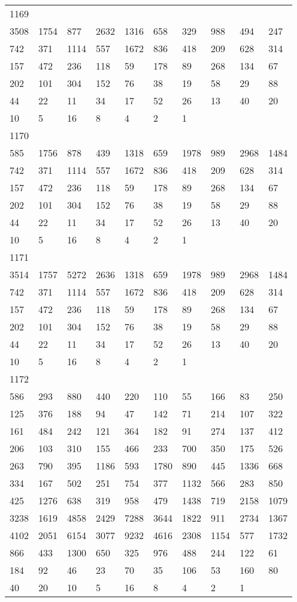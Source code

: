 \begin{longtable}{*{10}{l}}
1169&&&&&&&&&\\
3508& 1754& 877& 2632& 1316& 658& 329& 988& 494& 247\\
742& 371& 1114& 557& 1672& 836& 418& 209& 628& 314\\
157& 472& 236& 118& 59& 178& 89& 268& 134& 67\\
202& 101& 304& 152& 76& 38& 19& 58& 29& 88\\
44& 22& 11& 34& 17& 52& 26& 13& 40& 20\\
10& 5& 16& 8& 4& 2& 1& \\

1170&&&&&&&&&\\
585& 1756& 878& 439& 1318& 659& 1978& 989& 2968& 1484\\
742& 371& 1114& 557& 1672& 836& 418& 209& 628& 314\\
157& 472& 236& 118& 59& 178& 89& 268& 134& 67\\
202& 101& 304& 152& 76& 38& 19& 58& 29& 88\\
44& 22& 11& 34& 17& 52& 26& 13& 40& 20\\
10& 5& 16& 8& 4& 2& 1& \\

1171&&&&&&&&&\\
3514& 1757& 5272& 2636& 1318& 659& 1978& 989& 2968& 1484\\
742& 371& 1114& 557& 1672& 836& 418& 209& 628& 314\\
157& 472& 236& 118& 59& 178& 89& 268& 134& 67\\
202& 101& 304& 152& 76& 38& 19& 58& 29& 88\\
44& 22& 11& 34& 17& 52& 26& 13& 40& 20\\
10& 5& 16& 8& 4& 2& 1& \\

1172&&&&&&&&&\\
586& 293& 880& 440& 220& 110& 55& 166& 83& 250\\
125& 376& 188& 94& 47& 142& 71& 214& 107& 322\\
161& 484& 242& 121& 364& 182& 91& 274& 137& 412\\
206& 103& 310& 155& 466& 233& 700& 350& 175& 526\\
263& 790& 395& 1186& 593& 1780& 890& 445& 1336& 668\\
334& 167& 502& 251& 754& 377& 1132& 566& 283& 850\\
425& 1276& 638& 319& 958& 479& 1438& 719& 2158& 1079\\
3238& 1619& 4858& 2429& 7288& 3644& 1822& 911& 2734& 1367\\
4102& 2051& 6154& 3077& 9232& 4616& 2308& 1154& 577& 1732\\
866& 433& 1300& 650& 325& 976& 488& 244& 122& 61\\
184& 92& 46& 23& 70& 35& 106& 53& 160& 80\\
40& 20& 10& 5& 16& 8& 4& 2& 1& \\


\end{longtable}
